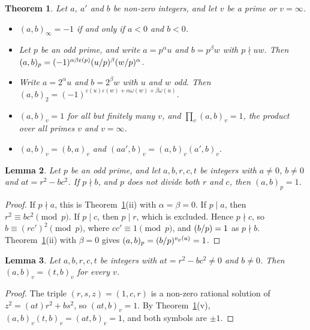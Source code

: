 \documentclass[11pt]{article}
\newtheorem{theorem}{Theorem}
\newtheorem{lemma}[theorem]{Lemma}
\newcommand{\leg}[2]{\mathchoice{\biggl(\dfrac{#1}{#2}\biggr)}{(#1/#2)}{(#1/#2)}{(#1/#2)}}
\begin{document}
\begin{theorem}\label{thm:hilbert}
Let $a$, $a'$ and $b$ be non-zero integers, and let $v$ be a prime or $v=\infty$.
\begin{itemize}
\item[(i)] $(a,b)_\infty=-1$ if and only if $a<0$ and $b<0$.
\item[(ii)] Let $p$ be an odd prime, and write $a=p^\alpha u$ and $b=p^\beta w$ with $p\nmid uw$. Then $(a,b)_p=(-1)^{\alpha\beta\varepsilon(p)}\leg{u}{p}^\beta\leg{w}{p}^\alpha$.
\item[(iii)] Write $a=2^\alpha u$ and $b=2^\beta w$ with $u$ and $w$ odd. Then $(a,b)_2=(-1)^{\varepsilon(u)\varepsilon(w)+\alpha\omega(w)+\beta\omega(u)}$.
\item[(iv)] $(a,b)_v=1$ for all but finitely many $v$, and $\prod_v(a,b)_v=1$, the product over all primes $v$ and $v=\infty$.
\item[(v)] $(a,b)_v=(b,a)_v$ and $(aa',b)_v=(a,b)_v(a',b)_v$.
\end{itemize}
\end{theorem}

\begin{lemma}\label{lem:good}
Let $p$ be an odd prime, and let $a,b,r,c,t$ be integers with $a\neq0$, $b\neq0$ and $at=r^2-bc^2$. If $p\nmid b$, and $p$ does not divide both $r$ and $c$, then $(a,b)_p=1$.
\end{lemma}

\begin{proof}
If $p\nmid a$, this is Theorem~\ref{thm:hilbert}(ii) with $\alpha=\beta=0$. If $p\mid a$, then $r^2\equiv bc^2\pmod p$. If $p\mid c$, then $p\mid r$, which is excluded. Hence $p\nmid c$, so $b\equiv(rc')^2\pmod p$, where $cc'\equiv1\pmod p$, and $\leg{b}{p}=1$ as $p\nmid b$. Theorem~\ref{thm:hilbert}(ii) with $\beta=0$ gives $(a,b)_p=\leg{b}{p}^{v_p(a)}=1$.
\end{proof}

\begin{lemma}\label{lem:cofactor}
Let $a,b,r,c,t$ be integers with $at=r^2-bc^2\neq0$ and $b\neq0$. Then $(a,b)_v=(t,b)_v$ for every $v$.
\end{lemma}

\begin{proof}
The triple $(r,s,z)=(1,c,r)$ is a non-zero rational solution of $z^2=(at)r^2+bs^2$, so $(at,b)_v=1$. By Theorem~\ref{thm:hilbert}(v), $(a,b)_v(t,b)_v=(at,b)_v=1$, and both symbols are $\pm1$.
\end{proof}
\end{document}

